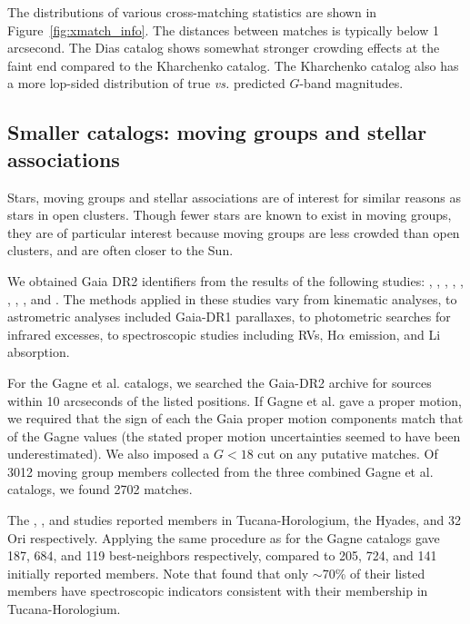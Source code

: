 \documentclass[12pt,twocolumn,tighten]{aastex62}
\begin{document}
The distributions of various cross-matching statistics are shown in
Figure~\ref{fig:xmatch_info}.  The distances between matches is
typically below 1 arcsecond.  The Dias catalog shows somewhat stronger
crowding effects at the faint end compared to the Kharchenko catalog.
The Kharchenko catalog also has a more lop-sided distribution of true
{\it vs.} predicted $G$-band magnitudes.


\subsection{Smaller catalogs: moving groups and stellar associations}
\label{subsec:mg}

Stars, moving groups and stellar associations are of interest for
similar reasons as stars in open clusters.  Though fewer stars
are known to exist in moving groups, they are of particular interest
because moving groups are less crowded than open clusters, and are
often closer to the Sun.

We obtained Gaia DR2 identifiers from the results of the following
studies:
\citet{gagne_banyan_XI_2018},
\citet{gagne_banyan_XII_2018},
\citet{gagne_banyan_XIII_2018},
\citet{kraus_tucanahor_2014},
\citet{roser_deep_2011}, %
\citet{bell_32ori_2017},
\citet{rizzuto_multidimensional_2011},
\citet{oh_comoving_2017}, and
\citet{zari_3d_2018}. The methods applied in these studies
vary from kinematic analyses, to astrometric analyses included
Gaia-DR1 parallaxes, to photometric searches for infrared excesses, to
spectroscopic studies including RVs, H$\alpha$
emission, and Li absorption.

For the Gagne et al{.} catalogs, we searched the Gaia-DR2 archive for
sources within 10 arcseconds of the listed positions.  If Gagne et
al{.} gave a proper motion, we required that the sign of each the Gaia
proper motion components match that of the Gagne values (the stated
proper motion uncertainties seemed to have been underestimated).  We
also imposed a $G<18$ cut on any putative matches.  Of 3012 moving
group members collected from the three combined Gagne et al{.}
catalogs, we found 2702 matches.

The \citet{kraus_tucanahor_2014}, \citet{roser_deep_2011}, and
\citet{bell_32ori_2017} studies reported members in Tucana-Horologium,
the Hyades, and 32$\,$Ori respectively.  Applying the same procedure as
for the Gagne catalogs gave 187, 684, and 119 best-neighbors
respectively, compared to 205, 724, and 141 initially reported
members.  Note that \citet{kraus_tucanahor_2014} found that only
$\sim$70\% of their listed members have spectroscopic indicators
consistent with their membership in Tucana-Horologium.
\end{document}
